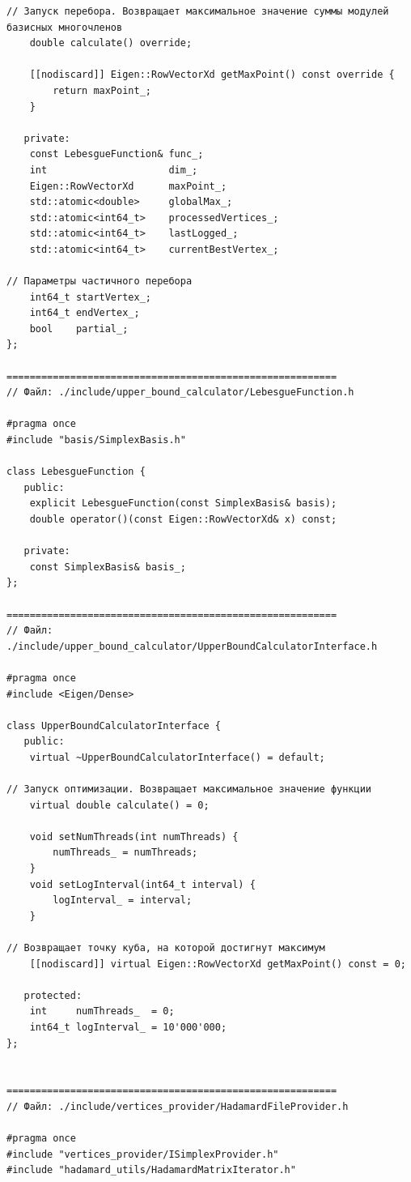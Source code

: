 \documentclass[appendix_B]{subfiles}
\begin{document}
\begin{lstlisting}
// Запуск перебора. Возвращает максимальное значение суммы модулей базисных многочленов
    double calculate() override;

    [[nodiscard]] Eigen::RowVectorXd getMaxPoint() const override {
        return maxPoint_;
    }

   private:
    const LebesgueFunction& func_;
    int                     dim_;
    Eigen::RowVectorXd      maxPoint_;
    std::atomic<double>     globalMax_;
    std::atomic<int64_t>    processedVertices_;
    std::atomic<int64_t>    lastLogged_;
    std::atomic<int64_t>    currentBestVertex_;

// Параметры частичного перебора
    int64_t startVertex_;
    int64_t endVertex_;
    bool    partial_;
};

=========================================================
// Файл: ./include/upper_bound_calculator/LebesgueFunction.h

#pragma once
#include "basis/SimplexBasis.h"

class LebesgueFunction {
   public:
    explicit LebesgueFunction(const SimplexBasis& basis);
    double operator()(const Eigen::RowVectorXd& x) const;

   private:
    const SimplexBasis& basis_;
};

=========================================================
// Файл: ./include/upper_bound_calculator/UpperBoundCalculatorInterface.h

#pragma once
#include <Eigen/Dense>

class UpperBoundCalculatorInterface {
   public:
    virtual ~UpperBoundCalculatorInterface() = default;

// Запуск оптимизации. Возвращает максимальное значение функции
    virtual double calculate() = 0;

    void setNumThreads(int numThreads) {
        numThreads_ = numThreads;
    }
    void setLogInterval(int64_t interval) {
        logInterval_ = interval;
    }

// Возвращает точку куба, на которой достигнут максимум
    [[nodiscard]] virtual Eigen::RowVectorXd getMaxPoint() const = 0;

   protected:
    int     numThreads_  = 0;
    int64_t logInterval_ = 10'000'000;
};


=========================================================
// Файл: ./include/vertices_provider/HadamardFileProvider.h

#pragma once
#include "vertices_provider/ISimplexProvider.h"
#include "hadamard_utils/HadamardMatrixIterator.h"


\end{lstlisting}
\end{document}
